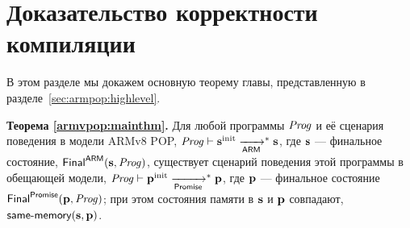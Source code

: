 \section{Доказательство корректности компиляции}
В этом разделе мы докажем основную теорему главы, представленную в
разделе~\ref{sec:armpop:highlevel}.

\noindent
  \textbf{Теорема \ref{armvpop:mainthm}.}
  Для любой программы $\mathit{Prog}$ и её сценария поведения в модели ARMv8 POP,
  $\mathit{Prog} \vdash \mathbf{s}^{\rm init} \xrightarrow[\mathsf{ARM}]{}^{*} \mathbf{s}$,
  где $\mathbf{s}$ --- финальное состояние, $\mathsf{Final}^{\mathsf{ARM}}(\mathbf{s}, \mathit{Prog})$,
  существует сценарий поведения этой программы в обещающей модели,
  $\mathit{Prog} \vdash \mathbf{p}^{\rm init} \xrightarrow[\mathsf{Promise}]{}^{*} \mathbf{p}$,
  где $\mathbf{p}$ --- финальное состояние $\mathsf{Final}^{\mathsf{Promise}}(\mathbf{p}, \mathit{Prog})$;
  при этом состояния памяти в $\mathbf{s}$ и $\mathbf{p}$ совпадают, $\textup{\sf same-memory}(\mathbf{s}, \mathbf{p})$.

